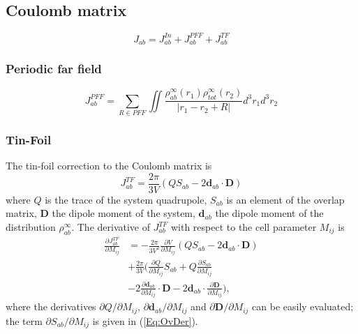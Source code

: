 \documentclass[pra,aps,twocolumn,showkeys,twocolumngrid,superbib]{revtex4}
\begin{document}
\subsection{Coulomb matrix}

\begin{equation}
  J_{ab}=J_{ab}^{In}+J_{ab}^{PFF}+J_{ab}^{TF}
\end{equation}


\subsubsection{Periodic far field}

\begin{equation}
  J_{ab}^{PFF}=\sum_{R\in PFF}\iint
  \frac{\rho_{ab}^{\infty}(r_1)\rho_{tot}^{\infty}(r_2)}{|r_1-r_2+R|}
  d^3r_1d^3r_2
\end{equation}

\subsubsection{Tin-Foil}
The tin-foil correction to the Coulomb matrix is
\begin{equation}
  J_{ab}^{TF}=\frac{2\pi}{3V}(QS_{ab}-2\mathbf{d}_{ab}\cdot\mathbf{D})
\end{equation}
where $Q$ is the trace of the system quadrupole, $S_{ab}$ is an element of the overlap matrix, 
$\mathbf{D}$ the dipole moment of the system,
$\mathbf{d}_{ab}$ the dipole moment of the distribution $\rho_{ab}^\infty$.
The derivative of $J_{ab}^{TF}$ with respect to the cell parameter $M_{ij}$ is
\begin{equation}
  \begin{split}
    \frac{\partial J_{ab}^{TF}}{\partial M_{ij}}&=
    -\frac{2\pi}{3V^2}\frac{\partial V}{\partial M_{ij}}(QS_{ab}-2\mathbf{d}_{ab}\cdot\mathbf{D})\\
    &+\frac{2\pi}{3V}(\frac{\partial Q}{\partial M_{ij}}S_{ab}+Q\frac{\partial S_{ab}}{\partial M_{ij}}\\
    &-2\frac{\partial \mathbf{d}_{ab}}{\partial M_{ij}}\cdot\mathbf{D}
    -2\mathbf{d}_{ab}\cdot\frac{\partial \mathbf{D}}{\partial M_{ij}}),
  \end{split}
\end{equation}
where the derivatives ${\partial Q}/{\partial M_{ij}}$, 
${\partial \mathbf{d}_{ab}}/{\partial M_{ij}}$ and 
${\partial \mathbf{D}}/{\partial M_{ij}}$ can be easily evaluated; 
the term ${\partial S_{ab}}/{\partial M_{ij}}$ 
is given in (\ref{Eq:OvDer}).
\end{document}

